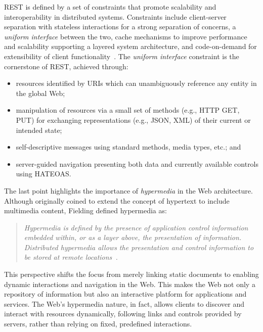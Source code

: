 \ac{REST} is defined by a set of constraints that promote scalability and interoperability in distributed systems. 
%
Constraints include client-server separation with stateless interactions for a strong separation of concerns, a \emph{uniform interface} between the two, cache mechanisms to improve performance and scalability supporting a layered system architecture, and code-on-demand for extensibility of client functionality~\cite{fielding2000architectural}.
%
The \emph{uniform interface} constraint is the cornerstone of \ac{REST}, achieved through:
\begin{itemize}
    \item resources identified by \acp{URI} which can unambiguously reference any entity in the global Web;
    \item manipulation of resources via a small set of methods (e.g., HTTP GET, PUT) for exchanging representations (e.g., JSON, XML) of their current or intended state; 
    \item self-descriptive messages using standard methods, media types, etc.;
    and
    \item server-guided navigation presenting both data and currently available controls using \ac{HATEOAS}.
\end{itemize}

The last point highlights the importance of \emph{hypermedia} in the Web architecture.
%
Although originally coined to extend the concept of hypertext to include multimedia content, Fielding defined hypermedia as:

\begin{quote}
\emph{
Hypermedia is defined by the presence of application control information embedded within, or as a layer above, the presentation of information. Distributed hypermedia allows the presentation and control information to be stored at remote locations~\cite{fielding2000architectural}.
}
\end{quote}

This perspective shifts the focus from merely linking static documents to enabling dynamic interactions and navigation in the Web.
%
This makes the Web not only a repository of information but also an interactive platform for applications and services.
%
The Web's hypermedia nature, in fact, allows clients to discover and interact with resources dynamically, following links and controls provided by servers, rather than relying on fixed, predefined interactions.

